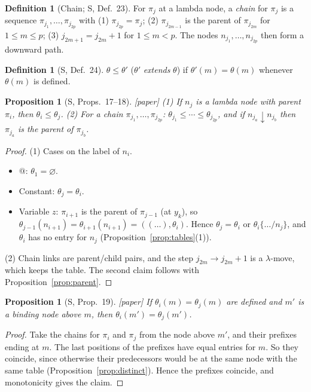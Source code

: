 \documentclass[11pt]{article}
\newcommand{\bnd}{\mathrel{\downarrow}}
\newcommand{\Paper}{\textsf{[paper]}}
\theoremstyle{plain}
\newtheorem{proposition}[theorem]{Proposition}
\theoremstyle{definition}
\newtheorem{definition}[theorem]{Definition}
\theoremstyle{remark}
\begin{document}
\begin{definition}[Chain; S, Def.~23]\label{def:chain}
For $\pi_j$ at a lambda node, a \emph{chain} for $\pi_j$ is a sequence
$\pi_{j_1},\dots,\pi_{j_{2p}}$ with
(1) $\pi_{j_{2p}}=\pi_j$;
(2) $\pi_{j_{2m-1}}$ is the parent of $\pi_{j_{2m}}$ for $1\le m\le p$;
(3) $j_{2m+1}=j_{2m}+1$ for $1\le m<p$.
The nodes $n_{j_1},\dots,n_{j_{2p}}$ then form a downward path.
\end{definition}

\begin{definition}[S, Def.~24]
$\theta\le\theta'$ ($\theta'$ \emph{extends} $\theta$) if $\theta'(m)=\theta(m)$
whenever $\theta(m)$ is defined.
\end{definition}

\begin{proposition}[S, Props.~17--18]\label{prop:mono}
\Paper{}
(1) If $n_j$ is a lambda node with parent $\pi_i$, then
$\theta_i\le\theta_j$.
(2) For a chain $\pi_{j_1},\dots,\pi_{j_{2p}}$:
$\theta_{j_1}\le\cdots\le\theta_{j_{2p}}$, and if $n_{j_a}\bnd n_{j_b}$
then $\pi_{j_a}$ is the parent of $\pi_{j_b}$.
\end{proposition}
\begin{proof}
(1) Cases on the label of $n_i$.
\begin{itemize}
\item $@$: $\theta_1=\varnothing$.
\item Constant: $\theta_j=\theta_i$.
\item Variable $z$: $\pi_{i+1}$ is the parent of $\pi_{j-1}$ (at $y_k$),
  so $\theta_{j-1}(n_{i+1})=\theta_{i+1}(n_{i+1})=((\dots),\theta_i)$.
  Hence $\theta_j=\theta_i$ or $\theta_i\{\dots/n_j\}$, and $\theta_i$
  has no entry for $n_j$ (Proposition~\ref{prop:tables}(1)).
\end{itemize}
(2) Chain links are parent/child pairs, and the step $j_{2m}\to
j_{2m}+1$ is a $\lambda$-move, which keeps the table.  The second claim
follows with Proposition~\ref{prop:parent}.
\end{proof}

\begin{proposition}[S, Prop.~19]\label{prop:agree}
\Paper{} If $\theta_i(m)=\theta_j(m)$ are defined and $m'$ is a binding
node above $m$, then $\theta_i(m')=\theta_j(m')$.
\end{proposition}
\begin{proof}
Take the chains for $\pi_i$ and $\pi_j$ from the node above $m'$, and
their prefixes ending at $m$.  The last positions of the prefixes have
equal entries for $m$.  So they coincide, since otherwise their
predecessors would be at the same node with the same table
(Proposition~\ref{prop:distinct}).  Hence the prefixes coincide, and
monotonicity gives the claim.
\end{proof}
\end{document}
